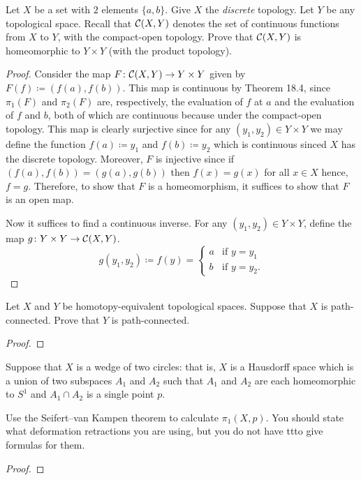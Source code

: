 \begin{problem}
Let $X$ be a set with $2$ elements $\{a,b\}$. Give $X$ the \emph{discrete}
topology. Let $Y$ be any topological space. Recall that $\mathcal{C}(X,Y)$
denotes the set of continuous functions from $X$ to $Y$, with the
compact-open topology. Prove that $\mathcal{C}(X,Y)$ is homeomorphic to $Y\times
Y$ (with the product topology).
\end{problem}
\begin{proof}
Consider the map $F\colon\mathcal{C}(X,Y)\to Y\times Y$ given by
$F(f)\coloneqq(f(a),f(b))$. This map is continuous by Theorem 18.4, since
$\pi_1(F)$ and $\pi_2(F)$ are, respectively, the evaluation of $f$ at $a$
and the evaluation of $f$ and $b$, both of which are continuous because
under the compact-open topology. This map is clearly surjective since for
any $(y_1,y_2)\in Y\times Y$ we may define the function $f(a)\coloneqq y_1$
and $f(b)\coloneqq y_2$ which is continuous sinced $X$ has the discrete
topology. Moreover, $F$ is injective since if $(f(a),f(b))=(g(a),g(b))$
then $f(x)=g(x)$ for all $x\in X$ hence, $f=g$. Therefore, to show that $F$
is a homeomorphism, it suffices to show that $F$ is an open map.

Now it suffices to find a continuous inverse. For any $(y_1,y_2)\in Y\times
Y$, define the map $g\colon Y\times Y\to\mathcal{C}(X,Y)$.
\[
g(y_1,y_2)\coloneqq f
(y)=\begin{cases}
a&\text{if $y=y_1$}\\
b&\text{if $y=y_2$}.
\end{cases}
\]

\end{proof}

\begin{problem}
Let $X$ and $Y$ be homotopy-equivalent topological spaces. Suppose that $X$
is path-connected. Prove that $Y$ is path-connected.
\end{problem}
\begin{proof}
\end{proof}

\begin{problem}
Suppose that $X$ is a wedge of two circles: that is, $X$ is a Hausdorff
space which is a union of two subspaces $A_1$ and $A_2$ such that $A_1$ and
$A_2$ are each homeomorphic to $S^1$ and $A_1\cap A_2$ is a single point $p$.

Use the Seifert--van Kampen theorem to calculate $\pi_1(X,p)$. You should
state what deformation retractions you are using, but you do not have ttto
give formulas for them.
\end{problem}
\begin{proof}
\end{proof}


